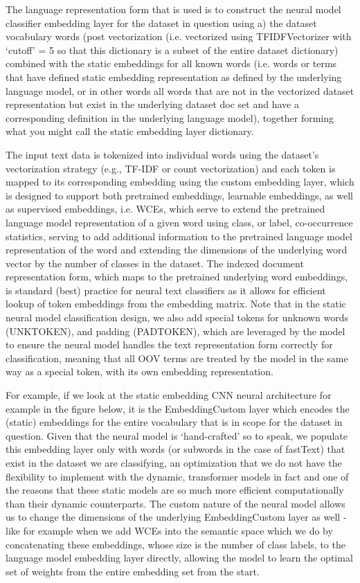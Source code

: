 \documentclass[final]{clv2025}
\begin{document}
The language representation form that is used is to construct the neural model classifier embedding layer for the dataset in question using a) the dataset vocabulary words (post vectorization (i.e. vectorized using TFIDFVectorizer with ‘cutoff’ = 5 so that this dictionary is a subset of the entire dataset dictionary) combined with the static embeddings for all known words (i.e. words or terms that have defined static embedding representation as defined by the underlying language model, or in other words all words that are not in the vectorized dataset representation but exist in the underlying dataset doc set and have a corresponding definition in the underlying language model), together forming what you might call the static embedding layer dictionary. 

The input text data is tokenized into individual words using the dataset’s vectorization strategy (e.g., TF-IDF or count vectorization) and each token is mapped to its corresponding embedding using the custom embedding layer, which is designed to support both pretrained embeddings, learnable embeddings, as well as supervised embeddings, i.e. WCEs, which serve to extend the pretrained language model representation of a given word using class, or label, co-occurrence statistics, serving to add additional information to the pretrained language model representation of the word and extending the dimensions of the underlying word vector by the number of classes in the dataset. The indexed document representation form, which maps to the pretrained underlying word embeddings, is standard (best) practice for neural text classifiers as it allows for efficient lookup of token embeddings from the embedding matrix. Note that in the static neural model classification design, we also add special tokens for unknown words (UNKTOKEN), and padding (PADTOKEN), which are leveraged by the model to ensure the neural model handles the text representation form correctly for classification, meaning that all OOV terms are treated by the model in the same way as a special token, with its own embedding representation. 

For example, if we look at the static embedding CNN neural architecture for example in the figure below, it is the EmbeddingCustom layer which encodes the (static) embeddings for the entire vocabulary that is in scope for the dataset in question. Given that the neural model is ‘hand-crafted’ so to speak, we populate this embedding layer only with words (or subwords in the case of fastText) that exist in the dataset we are classifying, an optimization that we do not have the flexibility to implement with the dynamic, transformer models in fact and one of the reasons that these static models are so much more efficient computationally than their dynamic counterparts. The custom nature of the neural model allows us to change the dimensions of the underlying EmbeddingCustom layer as well - like for example when we add WCEs into the semantic space which we do by concatenating these embeddings, whose size is the number of class labels, to the language model embedding layer directly, allowing the model to learn the optimal set of weights from the entire embedding set from the start.
\end{document}
